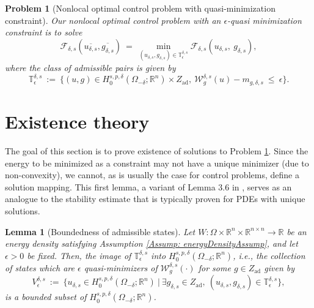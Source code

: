 \documentclass[11pt, reqno]{amsart}   	%
\theoremstyle{plain}
\numberwithin{equation}{section}
\newtheorem{lemma}[thm]{Lemma}
\newtheorem{problem}[thm]{Problem}
\def\de{\delta}
\def\ep{\epsilon}
\def\Om{\Omega}
\def\R{\mathbb{R}}
\def\ex{\exists}
\begin{document}
\begin{problem}[Nonlocal optimal control problem with quasi-minimization constraint]\label{Pr: NLQuasiMinimizers}
    Our nonlocal optimal control problem with an $\ep$-quasi minimization constraint is to solve
    \begin{equation}\label{Eq: stateMinNLQuasi}
			\mathcal{F}_{\de, s}(\overline{u_{\de, s}}, \overline{g_{\de, s}}) \ = \ \min_{(u_{\de, s}, g_{\de, s}) \in \mathbb{T}^{\de, s}_{\ep}}\mathcal{F}_{\de, s}(u_{\de, s}, \ g_{\de, s}),
		\end{equation} 
        where the class of admissible pairs is given by
        \begin{equation}\label{Eq: nonlocalAdmissSetQuasiEp}
    \mathbb{T}^{\de, s}_{\ep} \ := \ \{(u, g) \in H^{s, p, \de}_0(\Om_{-\de}; \R^n) \times Z_{\text{ad}}, \ \mathcal{W}^{\de, s}_g(u) - m_{g, \de, s} \ \leq \ \ep\}.
\end{equation}
\end{problem}


\section{Existence theory}\label{Sec: ExistenceQuasi}

The goal of this section is to prove existence of solutions to Problem \ref{Pr: NLQuasiMinimizers}. Since the energy to be minimized as a constraint may not have a unique minimizer (due to non-convexity), we cannot, as is usually the case for control problems, define a solution mapping. This first lemma, a variant of Lemma 3.6 in \cite{cueto2026localization}, serves as an analogue to the stability estimate that is typically proven for PDEs with unique solutions.

    \begin{lemma}[Boundedness of admissible states]\label{Lem: boundednessAdmissibleStatesNLQuasi}
        Let $W: \Om \times \R^n \times \R^{n \times n} \rightarrow \R$ be an energy density satisfying Assumption \ref{Assump: energyDensityAssump}, and let $\ep > 0$ be fixed. Then, the image of $\mathbb{T}^{\de, s}_{\ep}$ into $H^{s, p, \de}_0(\Om_{-\de}; \R^n)$, i.e., the collection of states which are $\ep$ quasi-minimizers of $\mathcal{W}^{\de, s}_g(\cdot)$ for some $g \in Z_{\text{ad}}$ given by
	\begin{equation}\label{Eq: UNLAdmisQuasi}
		V^{\de, s}_{\ep} \ := \ \{u_{\de, s} \in H^{s, p, \de}_0(\Om_{-\de}; \R^n) \ | \ \ex g_{\de, s} \in Z_{\text{ad}}, \ (u_{\de, s}, g_{\de, s}) \in \mathbb{T}^{\de, s}_{\ep}\},
	\end{equation}
	is a bounded subset of $H^{s, p, \de}_0(\Om_{-\de}; \R^n)$. 
    \end{lemma}
\end{document}
